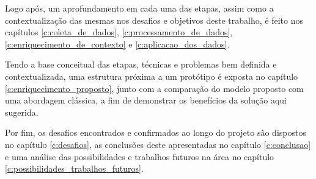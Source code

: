 Logo após, um aprofundamento em cada uma das etapas, assim como a contextualização das mesmas nos desafios e objetivos deste trabalho, é feito nos capítulos \ref{c:coleta_de_dados}, \ref{c:processamento_de_dados}, \ref{c:enriquecimento_de_contexto} e \ref{c:aplicacao_dos_dados}.

Tendo a base conceitual das etapas, técnicas e problemas bem definida e contextualizada, uma estrutura próxima a um protótipo é exposta no capítulo \ref{c:enriquecimento_proposto}, junto com a comparação do modelo proposto com uma abordagem clássica, a fim de demonstrar os benefícios da solução aqui sugerida.

Por fim, os desafios encontrados e confirmados ao longo do projeto são dispostos no capítulo \ref{c:desafios}, as conclusões deste apresentadas no capítulo \ref{c:conclusao} e uma análise das possibilidades e trabalhos futuros na área no capítulo \ref{c:possibilidades_trabalhos_futuros}.

